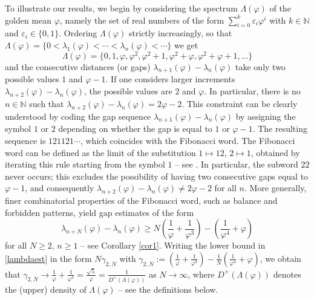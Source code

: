 \documentclass{amsart}
\newcommand{\NN}{\mathbb N}
\begin{document}
To illustrate our results, we begin by considering the spectrum $\Lambda (\varphi)$ of the golden mean $\varphi$, namely the set of real numbers of the form $\sum_{i=0}^k \varepsilon_i \varphi^i$
with $k\in \mathbb{N}$ and $\varepsilon_i \in \{0,1\}$. Ordering $\Lambda(\varphi)$ strictly increasingly, so that $\Lambda(\varphi)=\{0<\lambda_1(\varphi)<\cdots<\lambda_n(\varphi)<\cdots\}$ we get
$$\Lambda(\varphi)=\{0,1,\varphi,\varphi^2,\varphi^2+1,\varphi^2+\varphi,\varphi^2+\varphi+1,\dots\}$$ and the consecutive distances (or gaps) $\lambda_{n+1}(\varphi)-\lambda_{n}(\varphi)$ take only two possible values $1$ and $\varphi-1$. If one considers larger increments $\lambda_{n+2}(\varphi)-\lambda_{n}(\varphi)$, the possible values are $2$ and $\varphi$. In particular, there is no $n\in\NN$ such that $\lambda_{n+2}(\varphi)-\lambda_{n}(\varphi)=2\varphi-2$. This constraint can be clearly understood by coding the gap sequence $\lambda_{n+1}(\varphi)-\lambda_n(\varphi)$ by assigning the symbol $1$ or $2$ depending on whether the gap is equal to $1$ or $\varphi-1$. The resulting sequence is $121121\cdots$, which coincides with the Fibonacci word. The Fibonacci word can be defined as the limit of the substitution $1 \mapsto 12$, $2 \mapsto 1$, obtained by iterating this rule starting from the symbol $1$ -- see \cite{AS03}.  In particular, the subword $22$ never occurs; this excludes the possibility of having two consecutive gaps equal to $\varphi-1$, and consequently $\lambda_{n+2}(\varphi)-\lambda_n(\varphi) \neq 2\varphi - 2$ for all $n$. More generally, finer combinatorial properties of the Fibonacci word,
such as balance and forbidden patterns, yield gap estimates of the form
\begin{equation}\label{lambdaest}\lambda_{n+N}(\varphi)-\lambda_{n}(\varphi)\geq N\left(\frac{1}{\varphi}+\frac{1}{\varphi^3}\right) -\left(\frac{1}{\varphi^4}+\varphi\right)\end{equation}
for all $N\geq 2,\,n\geq 1$ -- see Corollary \ref{cor1}. Writing the lower bound in \eqref{lambdaest} in the form $N\gamma_{2,N}$ with $\gamma_{2,N}:=\left(\frac{1}{\varphi}+\frac{1}{\varphi^3}\right) -\frac{1}{N}\left(\frac{1}{\varphi^4}+\varphi\right)$, we obtain that $\gamma_{2,N}\to \frac{1}{\varphi}+\frac{1}{\varphi^3}=\frac{\sqrt{5}}{\varphi}=\frac{1}{D^+(\Lambda(\varphi))}$ as $N\to \infty$, where $D^+(\Lambda(\varphi))$ denotes the (upper) density of $\Lambda(\varphi)$  -- see the definitions below. 
\end{document}
